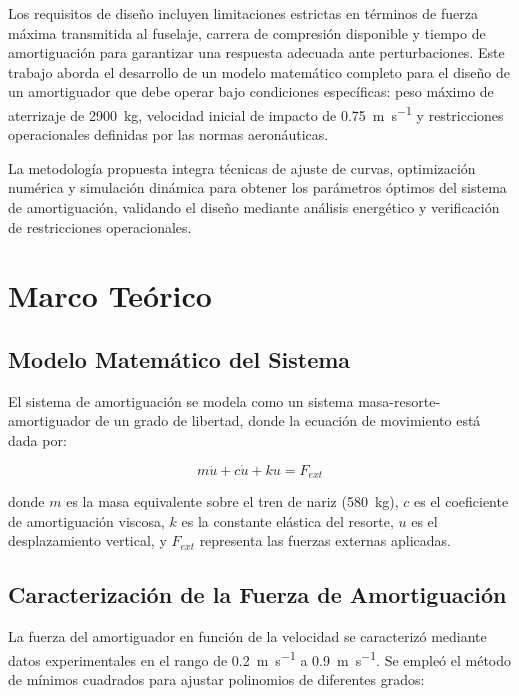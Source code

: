 \documentclass[journal]{IEEEtran}
\begin{document}
Los requisitos de diseño incluyen limitaciones estrictas en términos de fuerza máxima transmitida al fuselaje, carrera de compresión disponible y tiempo de amortiguación para garantizar una respuesta adecuada ante perturbaciones. Este trabajo aborda el desarrollo de un modelo matemático completo para el diseño de un amortiguador que debe operar bajo condiciones específicas: peso máximo de aterrizaje de \SI{2900}{\kilo\gram}, velocidad inicial de impacto de \SI{0.75}{\meter\per\second} y restricciones operacionales definidas por las normas aeronáuticas.

La metodología propuesta integra técnicas de ajuste de curvas, optimización numérica y simulación dinámica para obtener los parámetros óptimos del sistema de amortiguación, validando el diseño mediante análisis energético y verificación de restricciones operacionales.

\section{Marco Teórico}

\subsection{Modelo Matemático del Sistema}

El sistema de amortiguación se modela como un sistema masa-resorte-amortiguador de un grado de libertad, donde la ecuación de movimiento está dada por:

\begin{equation}
m\ddot{u} + c\dot{u} + ku = F_{ext}
\label{eq:motion}
\end{equation}

donde $m$ es la masa equivalente sobre el tren de nariz (\SI{580}{\kilo\gram}), $c$ es el coeficiente de amortiguación viscosa, $k$ es la constante elástica del resorte, $u$ es el desplazamiento vertical, y $F_{ext}$ representa las fuerzas externas aplicadas.

\subsection{Caracterización de la Fuerza de Amortiguación}

La fuerza del amortiguador en función de la velocidad se caracterizó mediante datos experimentales en el rango de \SI{0.2}{\meter\per\second} a \SI{0.9}{\meter\per\second}. Se empleó el método de mínimos cuadrados para ajustar polinomios de diferentes grados:
\end{document}
